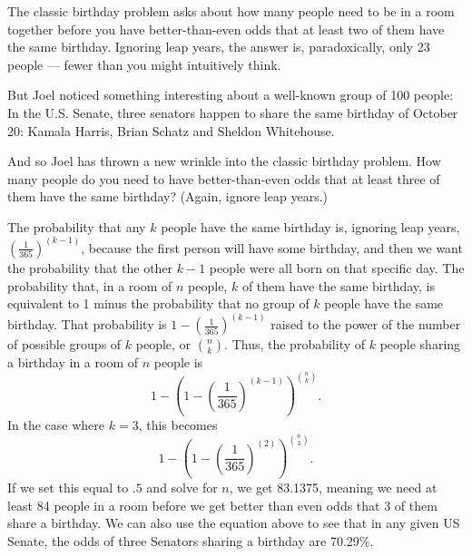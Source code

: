 \documentclass[12pt,letterpaper]{hmcpset}
\begin{document}
\begin{problem}
The classic birthday problem asks about how many people need to be in a room together before you have 
better-than-even odds that at least two of them have the same birthday. Ignoring leap years, the answer is, 
paradoxically, only 23 people — fewer than you might intuitively think.

But Joel noticed something interesting about a well-known group of 100 people: In the U.S. Senate, three senators 
happen to share the same birthday of October 20: Kamala Harris, Brian Schatz and Sheldon Whitehouse.

And so Joel has thrown a new wrinkle into the classic birthday problem. How many people do you need to have 
better-than-even odds that at least three of them have the same birthday? (Again, ignore leap years.)
\end{problem}

\begin{solution}
The probability that any $k$ people have the same birthday is, ignoring leap years, $\left(\frac{1}{365}\right)^{(k-1)}$,
because the first person will have some birthday, and then we want the probability that the other $k-1$ people were all
born on that specific day. The probability that, in a room of $n$ people, $k$ of them have the same birthday, is
equivalent to 1 minus the probability that no group of $k$ people have the same birthday. That probability is
$1-\left(\frac{1}{365}\right)^{(k-1)}$ raised to the power of the number of possible groups of $k$ people, or
${n \choose k}$. Thus, the probability of $k$ people sharing a birthday in a room of $n$ people is
$$1- \left(1-\left(\frac{1}{365}\right)^{(k-1)}\right)^{n \choose k}.$$
In the case where $k = 3$, this becomes
$$1- \left(1-\left(\frac{1}{365}\right)^{(2)}\right)^{n \choose 3}.$$
If we set this equal to $.5$ and solve for $n$, we get 83.1375, meaning we need at least 84 people in a room before we
get better than even odds that 3 of them share a birthday. We can also use the equation above to see that in any given
US Senate, the odds of three Senators sharing a birthday are 70.29\%.

\vfill
\end{solution}
\newpage
\end{document}
